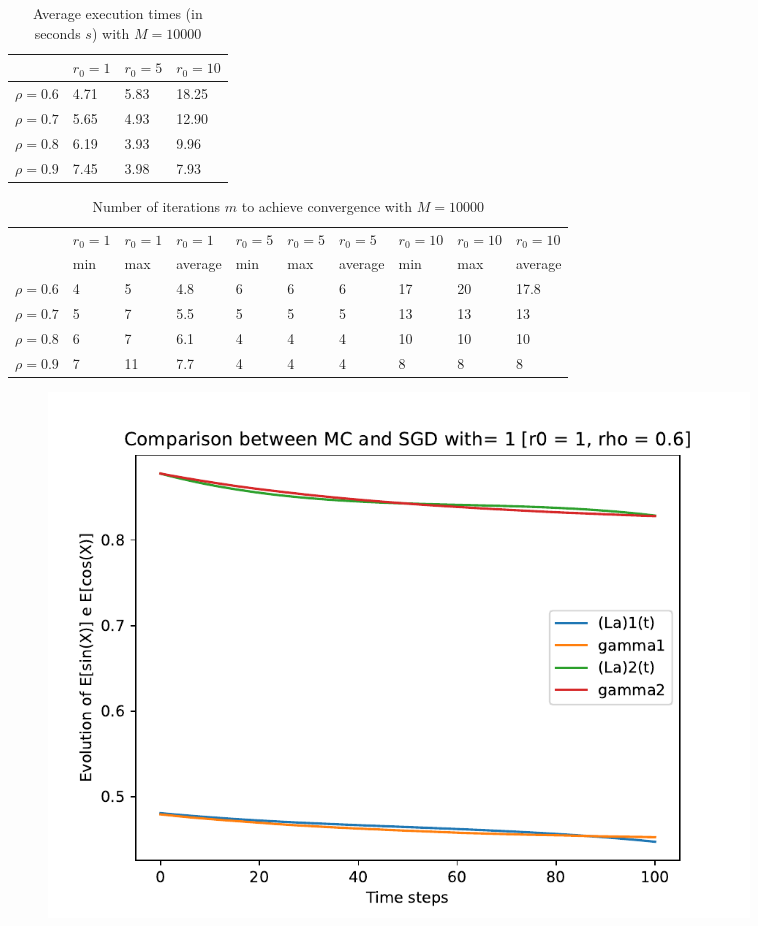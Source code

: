 \documentclass[a4paper,11pt,openright]{report}
\begin{document}
\begin{table}[H]
\centering
\addtolength{\leftskip}{-1.5cm}
\addtolength{\rightskip}{-1.5cm}
\begin{tabular}{|c|lll|}
\hline
$ $ & $r_0 = 1$ & $r_0 = 5$ & $r_0 = 10$ \\
\hline
$\rho = 0.6$ & 4.71 & 5.83 & 18.25 \\

$\rho = 0.7$ & 5.65 & 4.93 & 12.90 \\

$\rho = 0.8$ & 6.19 & 3.93 & 9.96 \\

$\rho = 0.9$ & 7.45 & 3.98 & 7.93 \\
\hline
\end{tabular}
\caption{Average execution
 times (in seconds $s$) with $M = 10000$}
\end{table}
\begin{table}[H]
\centering
\addtolength{\leftskip}{-1.5cm}
\addtolength{\rightskip}{-1.5cm}
\begin{tabular}{|c|lllllllll|}
\hline
$ $ & $r_0 = 1$ & $r_0 = 1$ & $r_0 = 1$ & $r_0 = 5$ & $r_0 = 5$ & $r_0 = 5$ & $r_0 = 10$ & $r_0 = 10$ & $r_0 = 10$  \\
$ $ & min & max & average & min & max & average & min & max & average \\ 
\hline
$\rho = 0.6$ & 4 & 5 & 4.8 & 6 & 6 & 6 & 17 & 20 & 17.8 \\

$\rho = 0.7$ & 5 & 7 & 5.5 & 5 & 5 & 5 & 13 & 13 & 13\\

$\rho = 0.8$ & 6 & 7 & 6.1 & 4 & 4 & 4 & 10 & 10 & 10\\

$\rho = 0.9$ & 7 & 11 & 7.7 & 4 & 4 & 4 & 8 & 8 & 8\\
\hline
\end{tabular}
\caption{Number of iterations $m$ to achieve convergence with $M = 10000$}
\end{table}
\begin{figure}[H]
\centering
\includegraphics[width=0.9\textwidth]{images/graphics T = 1/n = 3, M = 1 sine and cosine.pdf}
\end{figure}
\end{document}
